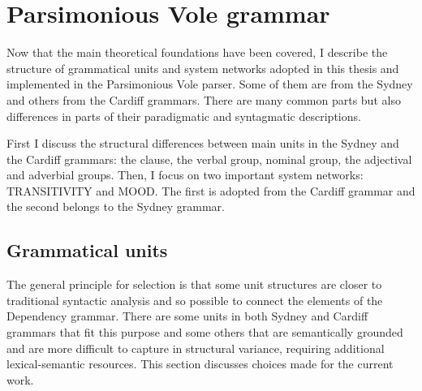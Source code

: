 \chapter{Parsimonious Vole grammar}
\label{ch:the-grammar}

Now that the main theoretical foundations have been covered, I describe the structure of grammatical units and system networks adopted in this thesis and implemented in the Parsimonious Vole parser. Some of them are from the Sydney and others from the Cardiff grammars. There are many common parts but also differences in parts of their paradigmatic and syntagmatic descriptions. %

First I discuss the structural differences between main units in the Sydney and the Cardiff grammars: the clause, the verbal group, nominal group, the adjectival and adverbial groups. Then, I focus on two important system networks: TRANSITIVITY  and MOOD. The first is adopted from the Cardiff grammar and the second belongs to the Sydney grammar.

\section{Grammatical units}
\label{sec:discussion-unit-classes}

The general principle for selection is that some unit structures are closer to traditional syntactic analysis and so possible to connect the elements of the Dependency grammar. There are some units in both Sydney and Cardiff grammars that fit this purpose and some others that are semantically grounded and are more difficult to capture in structural variance, requiring additional lexical-semantic resources. This section discusses choices made for the current work.


